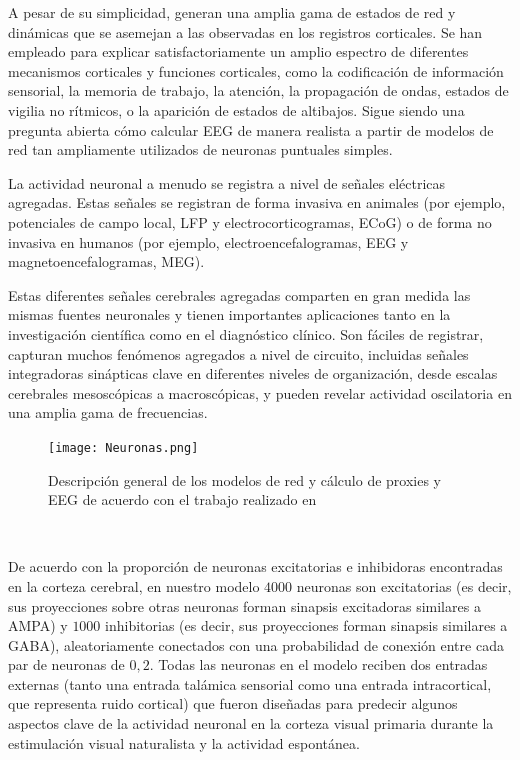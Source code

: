 \documentclass[oneside,openright,titlepage,numbers=noenddot,openany,headinclude,footinclude=true,
cleardoublepage=empty,abstractoff,BCOR=5mm,paper=a4,fontsize=12pt,main=spanish]{scrreprt}
\begin{document}
A pesar de su simplicidad, generan una amplia gama de estados de red y dinámicas que se asemejan a las observadas en los registros corticales. Se han empleado para explicar satisfactoriamente un amplio espectro de diferentes mecanismos corticales y funciones corticales, como la codificación de información sensorial, la memoria de trabajo, la atención, la propagación de ondas, estados de vigilia no rítmicos, o la aparición de estados de altibajos. Sigue siendo una pregunta abierta cómo calcular EEG de manera realista a partir de modelos de red tan ampliamente utilizados de neuronas puntuales simples.

La actividad neuronal a menudo se registra a nivel de señales eléctricas agregadas. Estas señales se registran de forma invasiva en animales (por ejemplo, potenciales de campo local, LFP y electrocorticogramas, ECoG) o de forma no invasiva en humanos (por ejemplo, electroencefalogramas, EEG y magnetoencefalogramas, MEG).

Estas diferentes señales cerebrales agregadas comparten en gran medida las mismas fuentes neuronales y tienen importantes aplicaciones tanto en la investigación científica como en el diagnóstico clínico. Son fáciles de registrar, capturan muchos fenómenos agregados a nivel de circuito, incluidas señales integradoras sinápticas clave en diferentes niveles de organización, desde escalas cerebrales mesoscópicas a macroscópicas, y pueden revelar actividad oscilatoria en una amplia gama de frecuencias.
    
\begin{figure}[h]
	\centering
	\texttt{[image: Neuronas.png]}
	\caption{Descripción general de los modelos de red y cálculo de proxies y EEG de acuerdo con el trabajo realizado en \cite{computationoftheelectroencephalogram}}
    \label{fig:distrnormal}
\end{figure}\

De acuerdo con la proporción de neuronas excitatorias e inhibidoras encontradas en la corteza cerebral, en nuestro modelo $4000$ neuronas son excitatorias (es decir, sus proyecciones sobre otras neuronas forman sinapsis excitadoras similares a AMPA) y $1000$ inhibitorias (es decir, sus proyecciones forman sinapsis similares a GABA), aleatoriamente conectados con una probabilidad de conexión entre cada par de neuronas de $0,2$. Todas las neuronas en el modelo reciben dos entradas externas (tanto una entrada talámica sensorial como una entrada intracortical, que representa ruido cortical) que fueron diseñadas para predecir algunos aspectos clave de la actividad neuronal en la corteza visual primaria durante la estimulación visual naturalista y la actividad espontánea.
\end{document}
